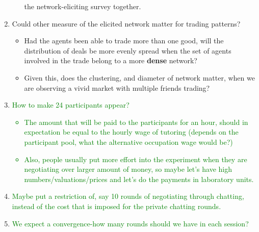 \documentclass{article}
\begin{document}
\begin{enumerate}
\begin{itemize}
                the network-eliciting survey together.
        \end{itemize}
    \item Could other measure of the elicited network matter for trading
        patterns?
        \begin{itemize}
            \item Had the agents been able to trade more than one good, will the
                distribution of deals be more evenly spread when the set of
                agents involved in the trade belong to a more \textbf{dense}
                network?
            \item Given this, does the clustering, and diameter of network
                matter, when we are observing a vivid market with multiple
                friends trading?
        \end{itemize}
        \item \textcolor{green}{How to make 24 participants appear?
        \begin{itemize}
            \item The amount that will be paid to the participants for an hour, should in expectation be equal to the hourly wage of tutoring (depends on the participant pool, what the alternative occupation wage would be?)
            \item Also, people usually put more effort into the experiment when they are negotiating over larger amount of money, so maybe let's have high numbers/valuations/prices and let's do the payments in laboratory units.
        \end{itemize}}
        \item \textcolor{green}{Maybe put a restriction of, say 10 rounds of negotiating through chatting, instead of the cost that is imposed for the private chatting rounds.}
       \item \textcolor{green}{We expect a convergence-how many rounds should we have in each session?}

\end{enumerate}




%
%
%
\end{document}
